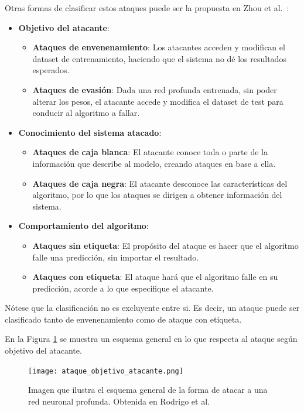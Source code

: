 Otras formas de clasificar estos ataques puede ser la propuesta en Zhou et al.~\cite{ArtCentralInfo}:
\begin{itemize}
	\item \textbf{Objetivo del atacante}:
	\begin{itemize}
		\item \textbf{Ataques de envenenamiento}: Los atacantes acceden y modifican el dataset de entrenamiento, haciendo que el sistema no dé los resultados esperados.
		\item \textbf{Ataques de evasión}: Dada una red profunda entrenada, sin poder alterar los pesos, el atacante accede y modifica el dataset de test para conducir al algoritmo a fallar.
	\end{itemize}
	\item \textbf{Conocimiento del sistema atacado}: 
	\begin{itemize}
		\item \textbf{Ataques de caja blanca}: El atacante conoce toda o parte de la información que describe al modelo, creando ataques en base a ella.
		\item \textbf{Ataques de caja negra}: El atacante desconoce las características del algoritmo, por lo que los ataques se dirigen a obtener información del sistema.
	\end{itemize}
	\item \textbf{Comportamiento del algoritmo}:
	\begin{itemize}
		\item \textbf{Ataques sin etiqueta}: El propósito del ataque es hacer que el algoritmo falle una predicción, sin importar el resultado.
		\item \textbf{Ataques con etiqueta}: El ataque hará que el algoritmo falle en su predicción, acorde a lo que especifique el atacante.
	\end{itemize}
\end{itemize}

Nótese que la clasificación no es excluyente entre si. Es decir, un ataque puede ser clasificado tanto de envenenamiento como de ataque con etiqueta.

En la Figura \ref{fig:ataques_scheme} se muestra un esquema general en lo que respecta al ataque según objetivo del atacante.

\begin{figure}[!htbp]
    \centering
    \texttt{[image: ataque\_objetivo\_atacante.png]}
    \caption{Imagen que ilustra el esquema general de la forma de atacar a una red neuronal profunda. Obtenida en Rodrigo et al.~\cite{RodrigoTFM}}
    \label{fig:ataques_scheme}
\end{figure}

